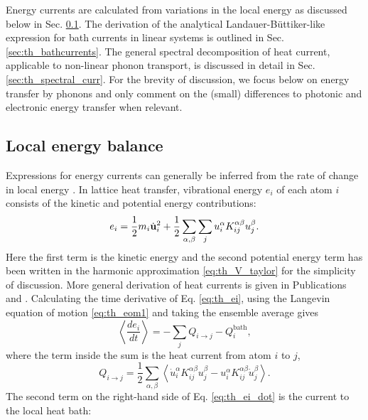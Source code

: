 Energy currents are calculated from variations in the local energy as discussed below in Sec. \ref{sec:th_energybalance}. The derivation of the analytical Landauer-B\"uttiker-like expression for bath currents in linear systems is outlined in Sec. \ref{sec:th_bathcurrents}. The general spectral decomposition of heat current, applicable to non-linear phonon transport, is discussed in detail in Sec. \ref{sec:th_spectral_curr}. For the brevity of discussion, we focus below on energy transfer by phonons and only comment on the (small) differences to photonic and electronic energy transfer when relevant. 




\subsection{Local energy balance}
\label{sec:th_energybalance}
Expressions for energy currents can generally be inferred from the rate of change in local energy \cite{hardy63}. In lattice heat transfer, vibrational energy $e_i$ of each atom $i$ consists of the kinetic and potential energy contributions:
\begin{equation}
 e_i = \frac{1}{2}m_i\dot{\mathbf{u}}_i^2 + \frac{1}{2} \sum_{\alpha,\beta}\sum_j u_i^{\alpha} K_{ij}^{\alpha\beta} u_j^{\beta} . \label{eq:th_ei}
\end{equation}
Here the first term is the kinetic energy and the second potential energy term has been written in the harmonic approximation \eqref{eq:th_V_taylor} for the simplicity of discussion. More general derivation of heat currents is given in Publications  and . Calculating the time derivative of Eq. \eqref{eq:th_ei}, using the Langevin equation of motion \eqref{eq:th_eom1} and taking the ensemble average gives
\begin{equation}
 \left\langle \frac{de_i}{dt} \right\rangle =  -\sum_j  Q_{i\to j} -  Q_i^{\textrm{bath}} , \label{eq:th_ei_dot}
\end{equation}
where the term inside the sum is the heat current from atom $i$ to $j$,
\begin{equation}
 Q_{i \to j} = \frac{1}{2} \sum_{\alpha,\beta} \left\langle \dot{u}_i^{\alpha}K_{ij}^{\alpha\beta} u_j^{\beta} - u_i^{\alpha} K_{ij}^{\alpha\beta} \dot{u}_j^{\beta} \right\rangle. \label{eq:th_Qij}
\end{equation}
The second term on the right-hand side of Eq. \eqref{eq:th_ei_dot} is the current to the local heat bath:
